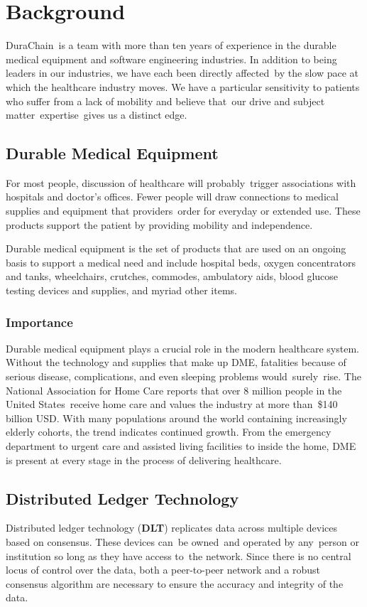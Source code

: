 \documentclass[preprint,pre,floats,aps,amsmath,amssymb]{revtex4-1}
\begin{document}
\section{Background}
DuraChain is a team with more than ten years of experience in the durable medical equipment and software engineering industries. In addition to being leaders in our industries, we have each been directly affected by the slow pace at which the healthcare industry moves. We have a particular sensitivity to patients who suffer from a lack of mobility and believe that our drive and subject matter expertise gives us a distinct edge.

\subsection{Durable Medical Equipment}
For most people, discussion of healthcare will probably trigger associations with hospitals and doctor's offices. Fewer people will draw connections to medical supplies and equipment that providers order for everyday or extended use. These products support the patient by providing mobility and independence.

Durable medical equipment is the set of products that are used on an ongoing basis to support a medical need and include hospital beds, oxygen concentrators and tanks, wheelchairs, crutches, commodes, ambulatory aids, blood glucose testing devices and supplies, and myriad other items.

  \subsubsection{Importance}
Durable medical equipment plays a crucial role in the modern healthcare system. Without the technology and supplies that make up DME, fatalities because of serious disease, complications, and even sleeping problems would surely rise. The National Association for Home Care reports that over 8 million people in the United States receive home care and values the industry at more than \$140 billion USD. With many populations around the world containing increasingly elderly cohorts, the trend indicates continued growth. From the emergency department to urgent care and assisted living facilities to inside the home, DME is present at every stage in the process of delivering healthcare.

\subsection{Distributed Ledger Technology}
Distributed ledger technology (\textbf{DLT}) replicates data across multiple devices based on consensus. These devices can be owned and operated by any person or institution so long as they have access to the network. Since there is no central locus of control over the data, both a peer-to-peer network and a robust consensus algorithm are necessary to ensure the accuracy and integrity of the data.
\end{document}
